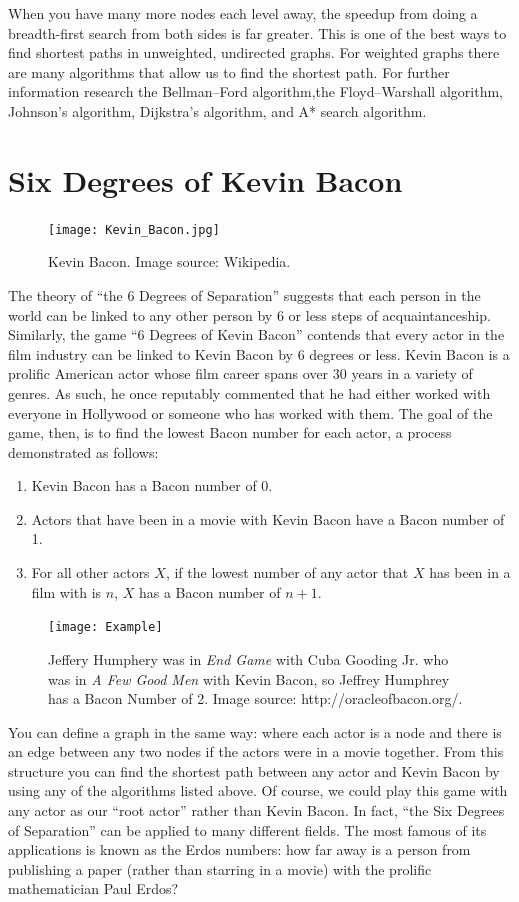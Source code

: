 When you have many more nodes each level away, the speedup from doing a breadth-first search from both sides is far greater. This is one of the best ways to find shortest
paths in unweighted, undirected graphs. For weighted graphs there are many algorithms that allow us to find the shortest path. For further information research
the Bellman–Ford algorithm,the Floyd–Warshall algorithm, Johnson's algorithm, Dijkstra's algorithm, and A* search algorithm.

\section*{Six Degrees of Kevin Bacon}
\begin{figure}[h]
\texttt{[image: Kevin\_Bacon.jpg]}
\caption{Kevin Bacon.  Image source: Wikipedia.}
\end{figure}

The theory of ``the 6 Degrees of Separation'' suggests that each person in the world can be linked to any other person by 6 or less steps of acquaintanceship.
Similarly, the game ``6 Degrees of Kevin Bacon'' contends that every actor in the film industry can be linked to Kevin Bacon by 6 degrees or less. Kevin Bacon
is a prolific American actor whose film career spans over 30 years in a variety of genres. As such, he once reputably commented that he had either worked with everyone in
Hollywood or someone who has worked with them. The goal of the game, then, is to find the lowest Bacon number for each actor, a process demonstrated as follows:
\begin{enumerate}
\item Kevin Bacon has a Bacon number of 0.
\item Actors that have been in a movie with Kevin Bacon have a Bacon number of 1.
\item For all other actors $X$, if the lowest number of any actor that $X$ has been in a film with is $n$, $X$ has a Bacon number of $n+1$.
\end{enumerate}

\begin{figure}[h]
\texttt{[image: Example]}
\caption{Jeffery Humphery was in \emph{End Game} with Cuba Gooding Jr. who was in \emph{A Few Good Men} with Kevin Bacon, so Jeffrey Humphrey has a Bacon Number of 2.  Image source: http://oracleofbacon.org/.}
\end{figure}

You can define a graph in the same way: where each actor is a node and there is an edge between any two nodes if the actors were in a movie together. From this structure you can find
the shortest path between any actor and Kevin Bacon by using any of the algorithms listed above. Of course, we could play this game with any actor as our ``root actor'' rather than Kevin Bacon. In
fact, ``the Six Degrees of Separation'' can be applied to many different fields. The most famous of its applications is known as the Erdos numbers: how far away is a person
 from publishing a paper (rather than starring in a movie) with the prolific mathematician Paul Erdos?

